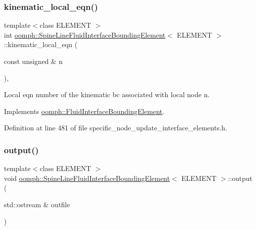 \subsubsection{\texorpdfstring{kinematic\+\_\+local\+\_\+eqn()}{kinematic\_local\_eqn()}}
{\footnotesize\ttfamily template$<$class E\+L\+E\+M\+E\+NT $>$ \\
int \hyperlink{classoomph_1_1SpineLineFluidInterfaceBoundingElement}{oomph\+::\+Spine\+Line\+Fluid\+Interface\+Bounding\+Element}$<$ E\+L\+E\+M\+E\+NT $>$\+::kinematic\+\_\+local\+\_\+eqn (\begin{DoxyParamCaption}\item[{const unsigned \&}]{n }\end{DoxyParamCaption})\hspace{0.3cm}{\ttfamily [inline]}, {\ttfamily [virtual]}}



Local eqn number of the kinematic bc associated with local node n. 



Implements \hyperlink{classoomph_1_1FluidInterfaceBoundingElement_a12a0a6d7c3c1c1a5a0f42a57e60eab34}{oomph\+::\+Fluid\+Interface\+Bounding\+Element}.



Definition at line 481 of file specific\+\_\+node\+\_\+update\+\_\+interface\+\_\+elements.\+h.

\mbox{\label{classoomph_1_1SpineLineFluidInterfaceBoundingElement_a5c074690d693fa7fb349b22e926064b4}} 
\subsubsection{\texorpdfstring{output()}{output()}\hspace{0.1cm}{\footnotesize\ttfamily [1/4]}}
{\footnotesize\ttfamily template$<$class E\+L\+E\+M\+E\+NT $>$ \\
void \hyperlink{classoomph_1_1SpineLineFluidInterfaceBoundingElement}{oomph\+::\+Spine\+Line\+Fluid\+Interface\+Bounding\+Element}$<$ E\+L\+E\+M\+E\+NT $>$\+::output (\begin{DoxyParamCaption}\item[{std\+::ostream \&}]{outfile }\end{DoxyParamCaption})\hspace{0.3cm}{\ttfamily [inline]}}



